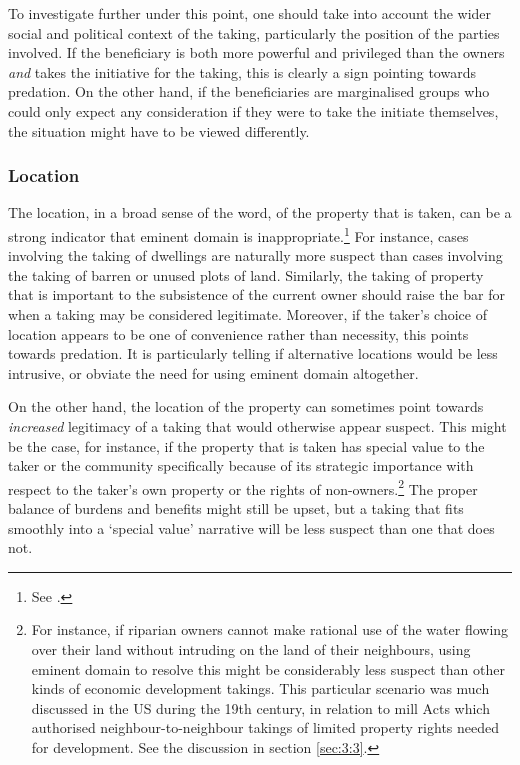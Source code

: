 To investigate further under this point, one should take into account the wider social and political context of the taking, particularly the position of the parties involved. If the beneficiary is both more powerful and privileged than the owners {\it and} takes the initiative for the taking, this is clearly a sign pointing towards predation. On the other hand, if the beneficiaries are marginalised groups who could only expect any consideration if they were to take the initiate themselves, the situation might have to be viewed differently. %

\subsubsection*{Location}

The location, in a broad sense of the word, of the property that is taken, can be a strong indicator that eminent domain is inappropriate.\footnote{See \cite[33-34]{gray11}.} For instance, cases involving the taking of dwellings are naturally more suspect than cases involving the taking of barren or unused plots of land. Similarly, the taking of property that is important to the subsistence of the current owner should raise the bar for when a taking may be considered legitimate. Moreover, if the taker's choice of location appears to be one of convenience rather than necessity, this points towards predation. It is particularly telling if alternative locations would be less intrusive, or obviate the need for using eminent domain altogether.


On the other hand, the location of the property can sometimes point towards {\it increased} legitimacy of a taking that would otherwise appear suspect. This might be the case, for instance, if the property that is taken has special value to the taker or the community specifically because of its strategic importance with respect to the taker's own property or the rights of non-owners.\footnote{For instance, if riparian owners cannot make rational use of the water flowing over their land without intruding on the land of their neighbours, using eminent domain to resolve this might be considerably less suspect than other kinds of economic development takings. This particular scenario was much discussed in the US during the 19th century, in relation to mill Acts which authorised neighbour-to-neighbour takings of limited property rights needed for development. See the discussion in section \ref{sec:3:3}.} The proper balance of burdens and benefits might still be upset, but a taking that fits smoothly into a `special value' narrative will be less suspect than one that does not.

